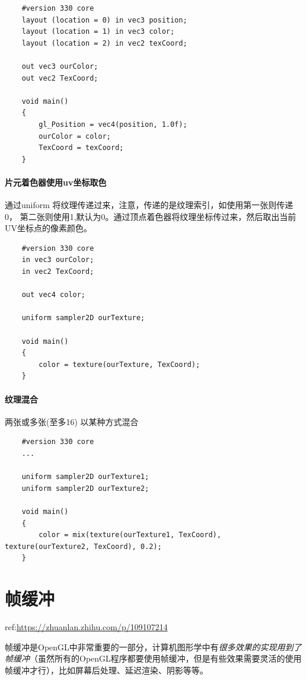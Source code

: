 \documentclass[UTF8,a4paper,12pt]{ctexbook}
\begin{document}
				\begin{lstlisting}
	#version 330 core
	layout (location = 0) in vec3 position;
	layout (location = 1) in vec3 color;
	layout (location = 2) in vec2 texCoord;
	
	out vec3 ourColor;
	out vec2 TexCoord;
	
	void main()
	{
	    gl_Position = vec4(position, 1.0f);
	    ourColor = color;
	    TexCoord = texCoord;
	}				
				\end{lstlisting}
				
			
			\paragraph{片元着色器使用uv坐标取色}
				
				通过uniform 将纹理传递过来，注意，传递的是纹理索引，如使用第一张则传递0， 第二张则使用1,默认为0。通过顶点着色器将纹理坐标传过来，然后取出当前UV坐标点的像素颜色。
			
				\begin{lstlisting}
	#version 330 core
	in vec3 ourColor;
	in vec2 TexCoord;
	
	out vec4 color;
	
	uniform sampler2D ourTexture;
	
	void main()
	{
	    color = texture(ourTexture, TexCoord);
	}				
				\end{lstlisting}
			
			
			\paragraph{纹理混合}
				两张或多张(至多16) 以某种方式混合
				
				\begin{lstlisting}
	#version 330 core
	...
	
	uniform sampler2D ourTexture1;
	uniform sampler2D ourTexture2;
	
	void main()
	{
	    color = mix(texture(ourTexture1, TexCoord), texture(ourTexture2, TexCoord), 0.2);
	}				
				\end{lstlisting}

	
	
	\section{帧缓冲}
		ref:\url{https://zhuanlan.zhihu.com/p/109107214}
	
		帧缓冲是OpenGL中非常重要的一部分，计算机图形学中有\textit{很多效果的实现用到了帧缓冲}（虽然所有的OpenGL程序都要使用帧缓冲，但是有些效果需要灵活的使用帧缓冲才行），比如屏幕后处理、延迟渲染、阴影等等。
	
\end{document}
